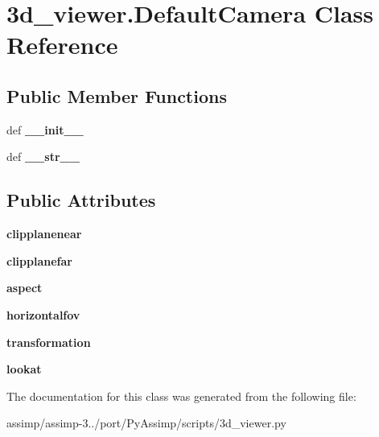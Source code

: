 \hypertarget{class3d__viewer_1_1_default_camera}{\section{3d\+\_\+viewer.Default\+Camera Class Reference}
\label{class3d__viewer_1_1_default_camera}
}
\subsection*{Public Member Functions}
\begin{DoxyCompactItemize}
\item 
\hypertarget{class3d__viewer_1_1_default_camera_a0fb29430704a7a02118e2e048722f309}{def {\bfseries \+\_\+\+\_\+init\+\_\+\+\_\+}}\label{class3d__viewer_1_1_default_camera_a0fb29430704a7a02118e2e048722f309}

\item 
\hypertarget{class3d__viewer_1_1_default_camera_adfe8bb574cbe4f85d0abd6dc2e3192c7}{def {\bfseries \+\_\+\+\_\+str\+\_\+\+\_\+}}\label{class3d__viewer_1_1_default_camera_adfe8bb574cbe4f85d0abd6dc2e3192c7}

\end{DoxyCompactItemize}
\subsection*{Public Attributes}
\begin{DoxyCompactItemize}
\item 
\hypertarget{class3d__viewer_1_1_default_camera_afc29d8955452dd0ae736333e6a7c5c64}{{\bfseries clipplanenear}}\label{class3d__viewer_1_1_default_camera_afc29d8955452dd0ae736333e6a7c5c64}

\item 
\hypertarget{class3d__viewer_1_1_default_camera_a36494cfc370ab8f7c9e4065030473a97}{{\bfseries clipplanefar}}\label{class3d__viewer_1_1_default_camera_a36494cfc370ab8f7c9e4065030473a97}

\item 
\hypertarget{class3d__viewer_1_1_default_camera_a5e08a78cf6a447f9899e29c0f72ae8ba}{{\bfseries aspect}}\label{class3d__viewer_1_1_default_camera_a5e08a78cf6a447f9899e29c0f72ae8ba}

\item 
\hypertarget{class3d__viewer_1_1_default_camera_a386ade4d1468b42677ffff8d36102d61}{{\bfseries horizontalfov}}\label{class3d__viewer_1_1_default_camera_a386ade4d1468b42677ffff8d36102d61}

\item 
\hypertarget{class3d__viewer_1_1_default_camera_a947131b8b30271c03ecf745fad285ce1}{{\bfseries transformation}}\label{class3d__viewer_1_1_default_camera_a947131b8b30271c03ecf745fad285ce1}

\item 
\hypertarget{class3d__viewer_1_1_default_camera_aaf0ed58de10e55d940004bfd01588730}{{\bfseries lookat}}\label{class3d__viewer_1_1_default_camera_aaf0ed58de10e55d940004bfd01588730}

\end{DoxyCompactItemize}


The documentation for this class was generated from the following file\+:\begin{DoxyCompactItemize}
\item 
assimp/assimp-\/3../port/\+Py\+Assimp/scripts/3d\+\_\+viewer.\+py\end{DoxyCompactItemize}
